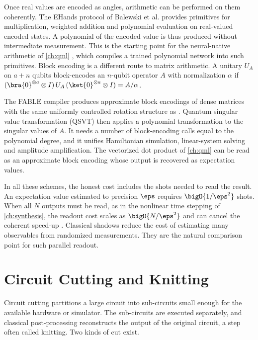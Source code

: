 Once real values are encoded as angles, arithmetic can be performed on them coherently. The EHands protocol of Balewski et al. \cite{balewski2025ehands} provides primitives for multiplication, weighted addition and polynomial evaluation on real-valued encoded states. A polynomial of the encoded value is thus produced without intermediate measurement. This is the starting point for the neural-native arithmetic of \cref{ch:qml} \cite{guo2026nnqa}, which compiles a trained polynomial network into such primitives. Block encoding is a different route to matrix arithmetic. A unitary $U_A$ on $a+n$ qubits block-encodes an $n$-qubit operator $A$ with normalization $\alpha$ if $(\bra{0}^{\otimes a}\otimes I)\,U_A\,(\ket{0}^{\otimes a}\otimes I)=A/\alpha$.

The FABLE compiler \cite{camps2022fable} produces approximate block encodings of dense matrices with the same uniformly controlled rotation structure as \qcrank{}. Quantum singular value transformation (QSVT) \cite{gilyen2019qsvt} then applies a polynomial transformation to the singular values of $A$. It needs a number of block-encoding calls equal to the polynomial degree, and it unifies Hamiltonian simulation, linear-system solving and amplitude amplification. The vectorized dot product of \cref{ch:qml} \cite{guo2025vqt} can be read as an approximate block encoding whose output is recovered as expectation values.

In all these schemes, the honest cost includes the shots needed to read the result. An expectation value estimated to precision $\eps$ requires $\bigO{1/\eps^2}$ shots. When all $N$ outputs must be read, as in the nonlinear time stepping of \cref{ch:synthesis}, the readout cost scales as $\bigO{N/\eps^2}$ and can cancel the coherent speed-up \cite{guo2026nonlinearwaves}. Classical shadows \cite{huang2020shadows} reduce the cost of estimating many observables from randomized measurements. They are the natural comparison point for such parallel readout.

\section{Circuit Cutting and Knitting}\label{sec:bg:cutting}

Circuit cutting partitions a large circuit into sub-circuits small enough for the available hardware or simulator. The sub-circuits are executed separately, and classical post-processing reconstructs the output of the original circuit, a step often called knitting. Two kinds of cut exist.

